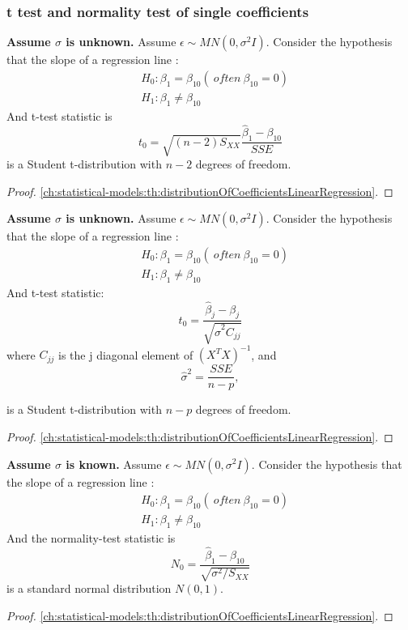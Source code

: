 \begin{refsection}
\subsubsection{t test and normality test of single coefficients}



\begin{lemma}\cite[261]{chinese2008probability}
\textbf{Assume $\sigma$ is unknown.}	Assume $\epsilon \sim MN(0,\sigma^2 I)$. Consider the hypothesis that the slope of a regression line :
	\begin{align*}
	&H_0: \beta_1 = \beta_{10} (~often ~ \beta_{10} = 0)\\
	&H_1: \beta_1 \neq \beta_{10}
	\end{align*}
	And t-test statistic is
	$$t_0 = \sqrt{(n-2)S_{XX}}\frac{\hat{\beta}_1 - \beta_{10}}{SSE}$$
	is a Student t-distribution with $n-2$ degrees of freedom. 
\end{lemma}
\begin{proof}
\autoref{ch:statistical-models:th:distributionOfCoefficientsLinearRegression}.
\end{proof}

\begin{lemma}\cite[261]{chinese2008probability}
	\textbf{Assume $\sigma$ is unknown.}	Assume $\epsilon \sim MN(0,\sigma^2 I)$. Consider the hypothesis that the slope of a regression line :
	\begin{align*}
	&H_0: \beta_1 = \beta_{10} (~often ~ \beta_{10} = 0)\\
	&H_1: \beta_1 \neq \beta_{10}
	\end{align*}
	And t-test statistic:
	$$t_0 = \frac{\hat{\beta}_j - \beta_j}{\sqrt{\hat{\sigma}^2C_{jj}}} $$
	where $C_{jj}$ is the j diagonal element of $(X^TX)^{-1}$, and $$\hat{\sigma}^2 = \frac{SSE}{n-p},$$
	
	is a Student t-distribution with $n-p$ degrees of freedom. 
\end{lemma}
\begin{proof}
	\autoref{ch:statistical-models:th:distributionOfCoefficientsLinearRegression}.
\end{proof}

\begin{lemma}\cite[261]{chinese2008probability}
	\textbf{Assume $\sigma$ is known.}	Assume $\epsilon \sim MN(0,\sigma^2 I)$. Consider the hypothesis that the slope of a regression line :
	\begin{align*}
	&H_0: \beta_1 = \beta_{10} (~often ~ \beta_{10} = 0)\\
	&H_1: \beta_1 \neq \beta_{10}
	\end{align*}
	And the normality-test statistic is
	$$N_0 = \frac{\hat{\beta}_1 - \beta_{10}}{\sqrt{\sigma^2/S_{XX}}}$$
	is a standard normal distribution $N(0,1)$. 
\end{lemma}
\begin{proof}
	\autoref{ch:statistical-models:th:distributionOfCoefficientsLinearRegression}.
\end{proof}


\end{refsection}
